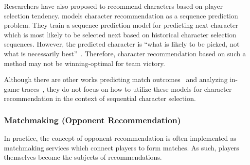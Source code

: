
Researchers have also proposed to recommend characters based on player selection tendency. \cite{summerville2017reco} models character recommendation as a sequence prediction problem. They train a sequence prediction model for predicting next character which is most likely to be selected next based on historical character selection sequences. However, the predicted character is ``what is
likely to be picked, not what is necessarily best''~\cite{summerville2017reco}. Therefore, character recommendation based on such a method may not be winning-optimal for team victory.

Although there are other works predicting match outcomes~\cite{Yang:identifying,Semenov2016,makarov2017predicting} and analyzing in-game traces~\cite{cavadenti2016did}, they do not focus on how to utilize these models for character recommendation in the context of sequential character selection.


\subsubsection{Matchmaking (Opponent Recommendation)}


In practice, the concept of opponent recommendation is often implemented as matchmaking services which connect players to form matches. As such, players themselves become the subjects of recommendations.


